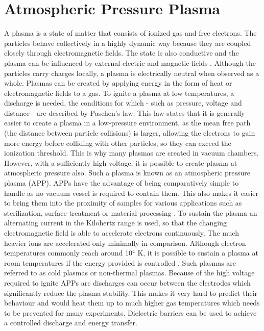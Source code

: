 \section{Atmospheric Pressure Plasma}
A plasma is a state of matter that consists of ionized gas and free electrons. The particles behave collectively in a highly dynamic way because they are coupled closely through electromagnetic fields. The state is also conductive and the plasma can be influenced by external electric and magnetic fields \cite{plasma}. Although the particles carry charges locally, a plasma is electrically neutral when observed as a whole. Plasmas can be created by applying energy in the form of heat or electromagnetic fields to a gas. To ignite a plasma at low temperatures, a discharge is needed, the conditions for which - such as pressure, voltage and distance - are described by Paschen's law. This law states that it is generally easier to create a plasma in a low-pressure environment, as the mean free path (the distance between particle collisions) is larger, allowing the electrons to gain more energy before colliding with other particles, so they can exceed the ionization threshold. This is why many plasmas are created in vacuum chambers. However, with a sufficiently high voltage, it is  possible to create plasma at atmospheric pressure also. Such a plasma is known as an atmospheric pressure plasma (APP). APPs have the advantage of being comparatively simple to handle as no vacuum vessel is required to contain them. This also makes it easier to bring them into the proximity of samples for various applications such as sterilization, surface treatment or material processing \cite{plasma}. To sustain the plasma an alternating current in the Kilohertz range is used, so that the changing electromagnetic field is able to accelerate electrons continuously. The much heavier ions are accelerated only minimally in comparison. Although electron temperatures commonly reach around 10$^4$ K, it is possible to sustain a plasma at room temperatures if the energy provided is controlled \cite{plasma2}. Such plasmas are referred to as cold plasmas or non-thermal plasmas. Because of the high voltage required to ignite APPs arc discharges can occur between the electrodes which significantly reduce the plasma stability. This makes it very hard to predict their behaviour and would heat them up to much higher gas temperatures which needs to be prevented for many experiments. Dielectric barriers can be used to achieve a controlled discharge and energy transfer. 


